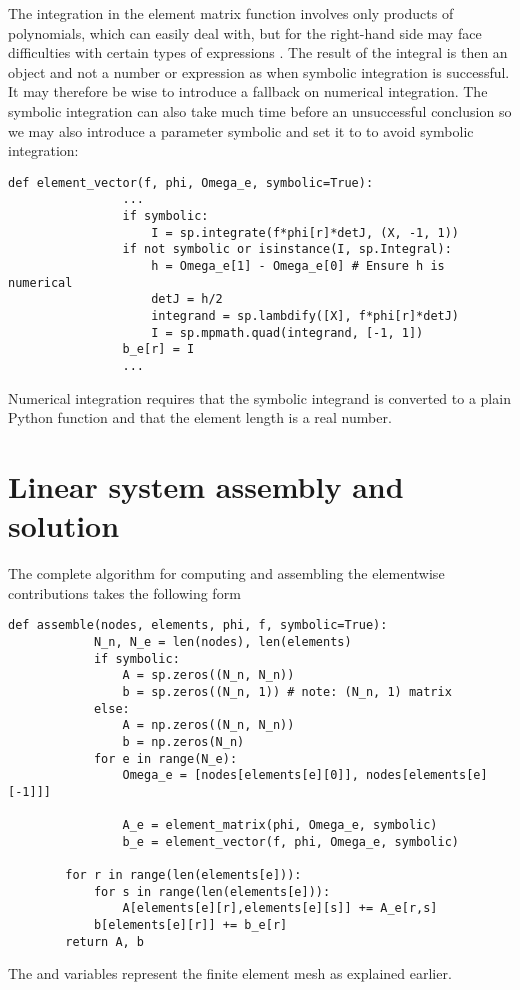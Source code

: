 \documentclass[../main.tex]{subfiles}
\begin{document}
	The integration in the element matrix function involves only products of polynomials, which  can easily deal with, but for the right-hand side  may face difficulties with certain types of expressions . The result of the integral is then an  object and not a number or expression as when symbolic integration is successful. It may therefore be wise to introduce a fallback on numerical integration. The symbolic integration can also take much time before an unsuccessful conclusion so we may also introduce a parameter symbolic and set it to   to avoid symbolic integration:
	\begin{lstlisting}[numbers=none]
		def element_vector(f, phi, Omega_e, symbolic=True):
				...
				if symbolic:
					I = sp.integrate(f*phi[r]*detJ, (X, -1, 1))
				if not symbolic or isinstance(I, sp.Integral):
					h = Omega_e[1] - Omega_e[0] # Ensure h is numerical
					detJ = h/2
					integrand = sp.lambdify([X], f*phi[r]*detJ)
					I = sp.mpmath.quad(integrand, [-1, 1])
				b_e[r] = I
				...
	\end{lstlisting}
	Numerical integration requires that the symbolic integrand is converted to a plain
	Python function  and that the element length  is a real number.
	\section[Linear system assembly and solution]{Linear system assembly and solution}
	\label{sec:sec_4_2}
	The complete algorithm for computing and assembling the elementwise contributions takes the following form
	\begin{lstlisting}[numbers=none]
		def assemble(nodes, elements, phi, f, symbolic=True):
			N_n, N_e = len(nodes), len(elements)
			if symbolic:
				A = sp.zeros((N_n, N_n))
				b = sp.zeros((N_n, 1)) # note: (N_n, 1) matrix
			else:
				A = np.zeros((N_n, N_n))
				b = np.zeros(N_n)
			for e in range(N_e):
				Omega_e = [nodes[elements[e][0]], nodes[elements[e][-1]]]
		
				A_e = element_matrix(phi, Omega_e, symbolic)
				b_e = element_vector(f, phi, Omega_e, symbolic)
		
		for r in range(len(elements[e])):
			for s in range(len(elements[e])):
				A[elements[e][r],elements[e][s]] += A_e[r,s]
			b[elements[e][r]] += b_e[r]
		return A, b	
	\end{lstlisting}
	The  and  variables represent the finite element mesh as explained earlier.
	
\end{document}

